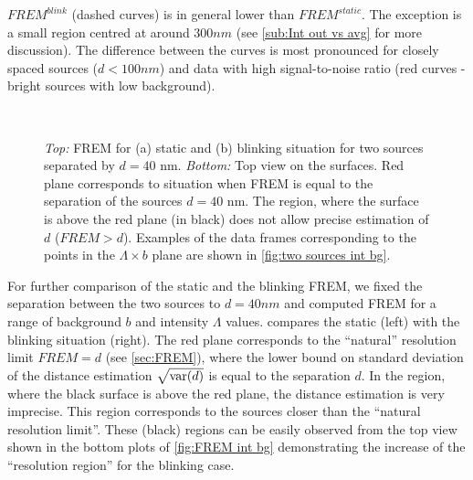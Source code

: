 $\unit{FREM}^{blink}$ (dashed curves) is in general lower than $\unit{FREM}^{static}$. The exception is a small region centred at around $300\unit{nm}$ (see \autoref{sub:Int out vs avg} for more discussion). The difference between the curves is most pronounced for closely spaced sources ($d<100\unit{nm}$) and data with high signal-to-noise ratio (red curves - bright sources with low background). 

\begin{figure}[!htb]
	\centering
	\newcommand{\wf}{.48\textwidth}
	\\
	\caption{{\it Top:} FREM for (a) static and (b) blinking situation for two sources separated by $d=40$ nm. {\it Bottom:} Top view on the surfaces. Red plane corresponds to situation when FREM is equal to the separation of the sources $d=40$ nm. The region, where the surface is above the red plane (in black) does not allow precise estimation of $d$ ($\unit{FREM}>d$). Examples of the data frames corresponding to the points in the $\Lambda \times b$ plane are shown in  \autoref{fig:two sources int bg}.}
	\label{fig:FREM int bg}
\end{figure}

%
For further comparison of the static and the blinking FREM, we fixed the separation between the two sources to $d=40\unit{nm}$ and computed FREM for a range of background $b$ and intensity  $\Lambda$ values.  compares the static (left) with the blinking situation (right). The red plane corresponds to the ``natural'' resolution limit $\unit{FREM}=d$ (see \autoref{sec:FREM}), where the lower bound on standard deviation of the distance estimation $\sqrt{\mathrm{var}(d)}$ is equal to the separation $d$. In the region, where the black surface is above the red plane, the distance estimation is very imprecise. This region corresponds to the sources closer than the ``natural resolution limit''.  These (black) regions can be easily observed from the top view shown in the bottom plots of \autoref{fig:FREM int bg} demonstrating the increase of the ``resolution region'' for the blinking case.

